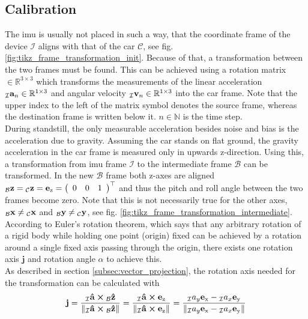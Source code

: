 \subsection{Calibration}
The \gls{imu} is usually not placed in such a way, that the coordinate frame of the device $\mathcal{I}$ aligns with that of the car $\mathcal{C}$, see fig. \ref{fig:tikz_frame_transformation_init}.
Because of that, a transformation between the two frames must be found.
This can be achieved using a rotation matrix  $\in \mathbb{R}^{3\times3}$ which transforms the measurements of the linear acceleration $\vincs{a}{I}_n \in \mathbb{R}^{1\times3}$ and angular velocity ${\vincs{v}{I}_n \in \mathbb{R}^{1\times3}}$ into the car frame.
Note that the upper index to the left of the matrix symbol denotes the source frame, whereas the destination frame is written below it.
 $n \in \mathbb{N}$ is the time step.\\
During standstill, the only measurable acceleration besides noise and bias is the acceleration due to gravity.
Assuming the car stands on flat ground, the gravity acceleration in the car frame is measured only in upwards z-direction.
Using this, a transformation from \gls{imu} frame $\mathcal{I}$ to the intermediate frame $\mathcal{B}$ can be transformed.
In the new $\mathcal{B}$ frame both z-axes are aligned $\vincs{z}{b} = \vincs{z}{c} = \mathbf{e}_\mathrm{z} = \left(\begin{array}{lll} 0 & 0 & 1 \end{array}\right)^{\top}$ and thus the pitch and roll angle  between the two frames become zero.
Note that this is not necessarily true for the other axes, $\vincs{x}{b}\neq\vincs{x}{c}$ and $\vincs{y}{b}\neq\vincs{y}{c}$, see fig. \ref{fig:tikz_frame_transformation_intermediate}.\\
According to Euler's rotation theorem, which says that any arbitrary rotation of a rigid body while holding one point (origin) fixed can be achieved by a rotation around a single fixed axis passing through the origin, there exists one rotation axis $\mathbf{j}$ and rotation angle $\alpha$ to achieve this.\\
As described in section \ref{subsec:vector_projection}, the rotation axis needed for the transformation can be calculated with
\begin{equation}
    \vb{j} = \frac{\vincs{\vu{a}}{i} \cp \vincs{\vu{z}}{b}}{\norm{\vincs{\vu{a}}{i} \cp \vincs{\vu{z}}{b}}}
    = \frac{\vincs{\vu{a}}{i} \cp \vb{e}_\mathrm{z}}{\norm{\vincs{\vu{a}}{i} \cp \vb{e}_\mathrm{z}}}
    = \frac{{}_{\mathcal{I}}a_y\vb{e}_\mathrm{x} - {}_{\mathcal{I}}a_x\vb{e}_\mathrm{y}}{\norm{{}_{\mathcal{I}}a_y\vb{e}_\mathrm{x} - {}_{\mathcal{I}}a_x\vb{e}_\mathrm{y}}}
\end{equation}
